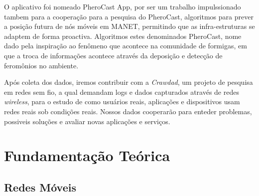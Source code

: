 \documentclass[12pt, %
openright, 
oneside, %
a4paper,    %
brazil]{facom-ufu-abntex2}
\begin{document}
O aplicativo foi nomeado PheroCast App, por ser um trabalho impulssionado tambem para a cooperação para a pesquisa do PheroCast, algoritmos para prever a posição futura de nós móveis em MANET, permitindo que as infra-estruturas se adaptem de forma proactiva. Algoritmos estes denominados PheroCast, nome dado pela inspiração ao fenômeno que acontece na comunidade de formigas, em que a troca de informações acontece através da deposição e detecção de feromônios no ambiente.
\cite{6838650}


Após coleta dos dados, iremos contribuir com a \emph{Crawdad}, um projeto de pesquisa em redes sem fio, a qual demandam logs e dados capturados através de redes \emph{wireless}, para o estudo de como usuários reais, aplicações e dispositivos usam redes reais sob condições reais. Nossos dados cooperarão para enteder problemas, possiveis soluções e avaliar novas aplicações e serviços.



\chapter{Fundamentação Teórica}
\section{Redes Móveis}
\end{document}

